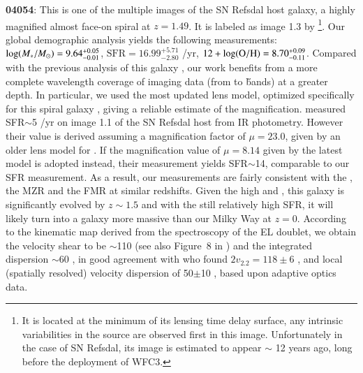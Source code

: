 {\bf 04054}: This is one of the multiple images of the SN Refsdal host galaxy, a highly magnified almost face-on spiral at
$z=1.49$. It is labeled as image 1.3 by \citet{2015arXiv151005750T}\footnote{It is located at the minimum of its lensing time
delay surface, any intrinsic variabilities in the source are observed first in this image.  Unfortunately in the case of SN
Refsdal, its image is estimated to appear $\sim$ 12 years ago, long before the deployment of WFC3.}.  Our global demographic
analysis yields the following measurements: $\log(M_\ast/M_\odot)=9.64_{-0.01}^{+0.05}$, $\textrm{SFR}=16.99_{-2.80}^{+5.71}$
\Msun/yr, $12+\log({\rm O/H})=8.70_{-0.11}^{+0.09}$.
Compared with the previous analysis of this galaxy \citep[][not necessarily the same image
though]{2015MNRAS.450.1812L,Rawle:2016dg}, our work benefits from a more complete wavelength coverage of imaging data (from \B to
\H bands) at a greater depth.  In particular, we used the most updated lens model, optimized specifically for this spiral galaxy
\citep{2015arXiv151005750T}, giving a reliable estimate of the magnification.
\citet{Rawle:2016dg} measured SFR$\sim$5 \Msun/yr on image 1.1 of the SN Refsdal host from \herschel IR photometry.
However their value is derived assuming a magnification factor of $\mu=23.0$, given by an older lens model for \clyi
\citep{Smith:2009cu}.
If the magnification value of $\mu=8.14$ given by the latest \glafic model is adopted instead, their measurement yields
SFR$\sim$14, comparable to our SFR measurement.
As a result, our measurements are fairly consistent with the \sfms, the MZR and the FMR at similar redshifts. Given the high
\Mstar and \oh, this galaxy is significantly evolved by $z\sim1.5$ and with the still relatively high SFR, it will likely turn
into a galaxy more massive than our Milky Way at $z=0$.  According to the kinematic map derived from the \muse spectroscopy of the
\OII EL doublet, we obtain the velocity shear to be $\sim$110 \kms (see also Figure~8 in \citet{2016ApJ...822...78G}) and the
integrated dispersion $\sim$60 \kms, in good agreement with \citet{2015MNRAS.450.1812L} who found $2v_{2.2}=118\pm6$ \kms, and
local (spatially resolved) velocity dispersion of 50$\pm$10 \kms, based upon adaptive optics data.

